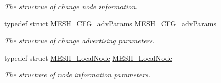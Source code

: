 \begin{DoxyCompactItemize}
\begin{DoxyCompactList}\small\item\em The structrue of change node information. \end{DoxyCompactList}\item 
typedef struct \hyperlink{struct_m_e_s_h___c_f_g__adv_params}{M\+E\+S\+H\+\_\+\+C\+F\+G\+\_\+adv\+Params} \hyperlink{group___m_e_s_h_ga941df94a7cd27cb9a8d25cff0e3e64c3}{M\+E\+S\+H\+\_\+\+C\+F\+G\+\_\+adv\+Params}\hypertarget{group___m_e_s_h_ga941df94a7cd27cb9a8d25cff0e3e64c3}{}\label{group___m_e_s_h_ga941df94a7cd27cb9a8d25cff0e3e64c3}

\begin{DoxyCompactList}\small\item\em The structrue of change advertising parameters. \end{DoxyCompactList}\item 
typedef struct \hyperlink{struct_m_e_s_h___local_node}{M\+E\+S\+H\+\_\+\+Local\+Node} \hyperlink{group___m_e_s_h_ga68e00bbe5d9e73891d1ebf3193f75af2}{M\+E\+S\+H\+\_\+\+Local\+Node}\hypertarget{group___m_e_s_h_ga68e00bbe5d9e73891d1ebf3193f75af2}{}\label{group___m_e_s_h_ga68e00bbe5d9e73891d1ebf3193f75af2}

\begin{DoxyCompactList}\small\item\em The structure of node information parameters. \end{DoxyCompactList}\end{DoxyCompactItemize}
